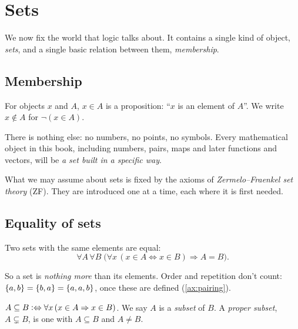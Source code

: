 \chapter{Sets}
\label{ch:sets}

We now fix the world that logic talks about. It contains a single kind of object,
\emph{sets}, and a single basic relation between them, \emph{membership}.

\section{Membership}

\begin{definition}[Membership]
\label{def:membership}
For objects $x$ and $A$, $x \in A$ is a proposition: \enquote{$x$ is an element of
$A$}. We write $x \notin A$ for $\lnot (x \in A)$.
\end{definition}

There is nothing else: no numbers, no points, no symbols. Every mathematical
object in this book, including numbers, pairs, maps and later functions and
vectors, will be \emph{a set built in a specific way}.

What we may assume about sets is fixed by the axioms of \emph{Zermelo--Fraenkel
set theory} (ZF). They are introduced one at a time, each where it is first
needed.

\section{Equality of sets}

\begin{axiom}[Extensionality]
\label{ax:extensionality}
Two sets with the same elements are equal:
\[
  \forall A\, \forall B\; \bigl( \forall x\, (x \in A \Leftrightarrow x \in B)
  \Rightarrow A = B \bigr).
\]
\end{axiom}

So a set is \emph{nothing more} than its elements. Order and repetition don't
count: $\lbrace a, b \rbrace = \lbrace b, a \rbrace = \lbrace a, a, b \rbrace$, once these are defined
(\cref{ax:pairing}).

\begin{definition}[Subset]
\label{def:subset}
$A \subseteq B \mathrel{\vcentcolon\Leftrightarrow} \forall x\, (x \in A \Rightarrow x \in B)$. We say $A$ is a
\emph{subset} of $B$. A \emph{proper subset}, $A \subsetneq B$, is one with $A
\subseteq B$ and $A \neq B$.
\end{definition}


